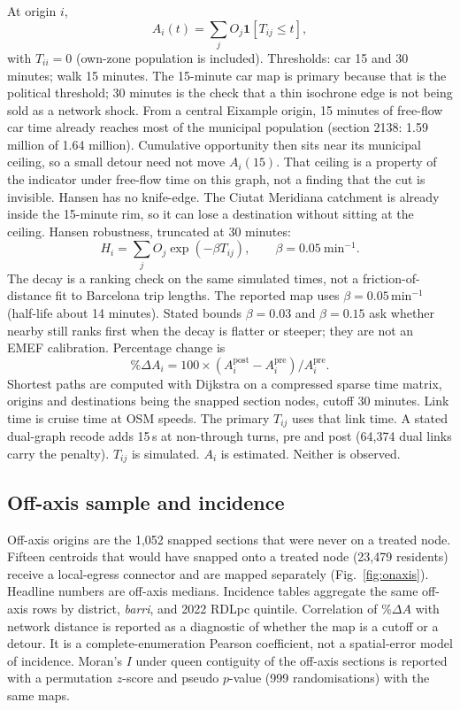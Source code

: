 \documentclass[a4paper,fleqn]{cas-dc}
\begin{document}
At origin $i$,
\begin{equation}
A_i(t) = \sum_j O_j \mathbf{1}[T_{ij} \le t],
\label{eq:cumopp}
\end{equation}
with $T_{ii} = 0$ (own-zone population is included). Thresholds: car 15 and
30 minutes; walk 15 minutes. The 15-minute car map is primary because that
is the political threshold; 30 minutes is the check that a thin isochrone
edge is not being sold as a network shock. From a central Eixample origin,
15 minutes of free-flow car time already reaches most of the municipal
population (section 2138: 1.59 million of 1.64 million). Cumulative
opportunity then sits near its municipal ceiling, so a small detour need not
move $A_i(15)$. That ceiling is a property of the indicator under free-flow
time on this graph, not a finding that the cut is invisible. Hansen has no
knife-edge. The Ciutat Meridiana catchment is already inside the 15-minute
rim, so it can lose a destination without sitting at the ceiling.
Hansen robustness, truncated at 30 minutes:
\begin{equation}
H_i = \sum_j O_j \exp(-\beta T_{ij}), \qquad
\beta = 0.05~\mathrm{min}^{-1}.
\label{eq:hansen}
\end{equation}
The decay is a ranking check on the same simulated times, not a
friction-of-distance fit to Barcelona trip lengths. The reported map uses
$\beta = 0.05$\,min$^{-1}$ (half-life about 14 minutes). Stated bounds
$\beta = 0.03$ and $\beta = 0.15$ ask whether nearby still ranks first when
the decay is flatter or steeper; they are not an EMEF calibration. Percentage change is
\begin{equation}
\%\Delta A_i = 100 \times
(A_i^{\mathrm{post}} - A_i^{\mathrm{pre}}) / A_i^{\mathrm{pre}}.
\label{eq:pct}
\end{equation}
Shortest paths are computed with Dijkstra on a compressed sparse time
matrix, origins and destinations being the snapped section nodes, cutoff
30 minutes. Link time is cruise time at OSM speeds. The primary $T_{ij}$
uses that link time. A stated dual-graph recode adds 15\,s at non-through
turns, pre and post (64{,}374 dual links carry the penalty). $T_{ij}$ is
simulated. $A_i$ is estimated. Neither is observed.

\subsection{Off-axis sample and incidence}

Off-axis origins are the 1{,}052 snapped sections that were never
on a treated node. Fifteen centroids that would have snapped onto a treated
node (23{,}479 residents) receive a local-egress connector and are mapped
separately (Fig.~\ref{fig:onaxis}). Headline numbers are off-axis medians. Incidence tables aggregate the same off-axis rows by
district, \emph{barri}, and 2022 RDLpc quintile. Correlation of $\%\Delta A$
with network distance is reported as a diagnostic of whether the map is a
cutoff or a detour. It is a complete-enumeration Pearson coefficient, not a
spatial-error model of incidence. Moran's $I$ under queen contiguity of the
off-axis sections is reported with a permutation $z$-score and pseudo
$p$-value (999 randomisations) with the same maps.
\end{document}
